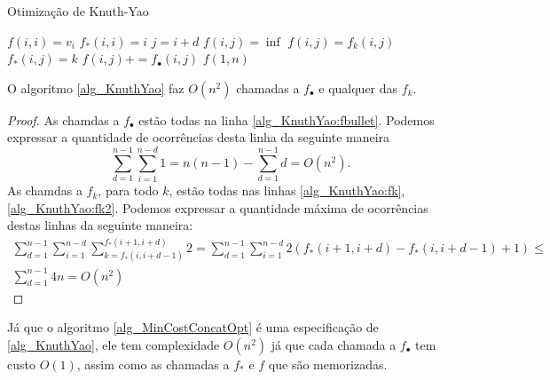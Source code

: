 \begin{algorithm}[H]
\caption{Otimização de Knuth-Yao}
\label{alg_KnuthYao}
\begin{algorithmic}[1]
        \State $f(i,i) = v_i$
        \State $f_*(i,i) = i$
    \EndFor
            \State $j = i+d$
            \State $f(i,j) = \inf$
                 \label{alg_KnuthYao:fk}
                    \State $f(i,j) = f_k(i,j)$ \label{alg_KnuthYao:fk2}
                    \State $f_*(i,j) = k$
                \EndIf
            \EndFor
            \State $f(i,j) += f_\bullet(i,j)$ \label{alg_KnuthYao:fbullet}
        \EndFor
    \EndFor
    \State \Return $f(1,n)$
\EndFunction
\end{algorithmic}
\end{algorithm}

\begin{prop}
O algoritmo \ref{alg_KnuthYao} faz $O(n^2)$ chamadas a $f_\bullet$ e qualquer das $f_k$.
\end{prop}

\begin{proof}
As chamdas a $f_\bullet$ estão todas na linha \ref{alg_KnuthYao:fbullet}. Podemos expressar a quantidade de ocorrências desta linha da seguinte maneira
$$ \sum\limits_{d=1}^{n-1} \sum\limits_{i=1}^{n-d} 1 = n(n-1) - \sum\limits_{d=1}^{n-1} d = O(n^2). $$
As chamdas a $f_k$, para todo $k$, estão todas nas linhas \ref{alg_KnuthYao:fk}, \ref{alg_KnuthYao:fk2}. Podemos expressar a quantidade máxima de ocorrências destas linhas da seguinte maneira:
\begin{multline*} 
\sum\limits_{d=1}^{n-1} \sum\limits_{i=1}^{n-d} \sum\limits_{k=f_*(i,i+d-1)}^{f_*(i+1,i+d)} 2 =
\sum\limits_{d=1}^{n-1} \sum\limits_{i=1}^{n-d} 2(f_*(i+1,i+d) - f_*(i,i+d-1) + 1) \leq \\
\sum\limits_{d=1}^{n-1} 4n = O(n^2)
\end{multline*}
\end{proof}

Já que o algoritmo \ref{alg_MinCostConcatOpt} é uma especificação de \ref{alg_KnuthYao}, ele tem complexidade $O(n^2)$ já que cada chamada a $f_\bullet$ tem custo $O(1)$, assim como as chamadas a $f_*$ e $f$ que são memorizadas.

